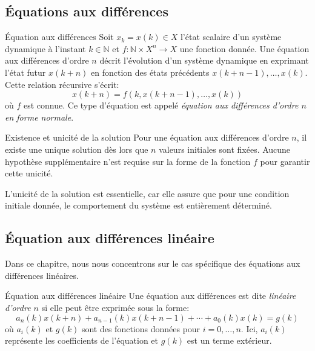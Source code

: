         \subsection{Équations aux différences}
            \begin{definition}{Équation aux différences} 
                Soit $x_k = x(k) \in X$ l’état scalaire d’un système dynamique à l’instant $k \in \mathbb{N}$ et $f: \mathbb{N} \times X^n \to X$ une fonction donnée. Une équation aux différences d'ordre $n$ décrit l'évolution d'un système dynamique en exprimant l'état futur $x(k+n)$ en fonction des états précédents $x(k+n-1), \dots, x(k)$. Cette relation récursive s'écrit:
                \begin{equation}\label{eq:eq_difference}
                    x(k+n) = f(k, x(k+n-1), \dots, x(k))
                \end{equation}
                où $f$ est connue. Ce type d'équation est appelé \textit{équation aux différences d’ordre $n$ en forme normale}.
            \end{definition}
    
            \begin{theorem}{Existence et unicité de la solution}
                Pour une équation aux différences d'ordre $n$, il existe une unique solution dès lors que $n$ valeurs initiales sont fixées. Aucune hypothèse supplémentaire n'est requise sur la forme de la fonction $f$ pour garantir cette unicité.
            \end{theorem}
            L'unicité de la solution est essentielle, car elle assure que pour une condition initiale donnée, le comportement du système est entièrement déterminé.

        \subsection{Équation aux différences linéaire}
            Dans ce chapitre, nous nous concentrons sur le cas spécifique des équations aux différences linéaires.
            \begin{definition}{Équation aux différences linéaire}
                Une équation aux différences est dite \textit{linéaire d’ordre $n$} si elle peut être exprimée sous la forme:
                \begin{equation}\label{eq:eq_difference_lineaire}
                    a_n(k)x(k+n)+a_{n-1}(k)x(k+n-1)+\cdots+a_0(k)x(k) = g(k)
                \end{equation}
                où $a_i(k)$ et $g(k)$ sont des fonctions données pour $i = 0, \dots, n$. Ici, $a_i(k)$ représente les coefficients de l'équation et $g(k)$ est un terme extérieur.
            \end{definition}
        
